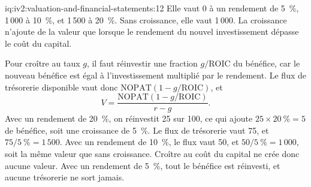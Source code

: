 \begin{solution}{iq:iv2:valuation-and-financial-statements:12}
Elle vaut 0 à un rendement de 5~\%, 1\,000 à 10~\%, et 1\,500 à 20~\%. Sans croissance, elle vaut 1\,000. La croissance n'ajoute de la valeur que lorsque le rendement du nouvel investissement dépasse le coût du capital.

Pour croître au taux $g$, il faut réinvestir une fraction $g/\mathrm{ROIC}$ du bénéfice, car le nouveau bénéfice est égal à l'investissement multiplié par le rendement. Le flux de trésorerie disponible vaut donc $\mathrm{NOPAT}(1 - g/\mathrm{ROIC})$, et
\[
V = \frac{\mathrm{NOPAT}\left(1 - g/\mathrm{ROIC}\right)}{r - g}.
\]
Avec un rendement de 20~\%, on réinvestit 25 sur 100, ce qui ajoute $25 \times 20~\% = 5$ de bénéfice, soit une croissance de 5~\%. Le flux de trésorerie vaut 75, et $75/5~\% = 1\,500$. Avec un rendement de 10~\%, le flux vaut 50, et $50/5~\% = 1\,000$, soit la même valeur que sans croissance. Croître au coût du capital ne crée donc aucune valeur. Avec un rendement de 5~\%, tout le bénéfice est réinvesti, et aucune trésorerie ne sort jamais.

\end{solution}

